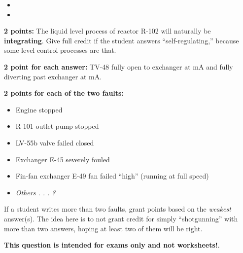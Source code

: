 \begin{itemize}
\item{} 
\vskip 5pt
\item{} 
\end{itemize}







{\bf 2 points:} The liquid level process of reactor R-102 will naturally be {\bf integrating}.  Give full credit if the student answers ``self-regulating,'' because some level control processes are that.

\vskip 10pt

{\bf 2 point for each answer:} TV-48 fully open to exchanger at  mA and fully diverting past exchanger at  mA.

\vskip 10pt

{\bf 2 points for each of the two faults:}

\begin{itemize}
\item{} Engine stopped
\item{} R-101 outlet pump stopped
\item{} LV-55b valve failed closed
\item{} Exchanger E-45 severely fouled
\item{} Fin-fan exchanger E-49 fan failed ``high'' (running at full speed)
\item{} {\it Others . . . ?}
\end{itemize}

If a student writes more than two faults, grant points based on the {\it weakest} answer(s).  The idea here is to not grant credit for simply ``shotgunning'' with more than two answers, hoping at least two of them will be right.







{\bf This question is intended for exams only and not worksheets!}.



